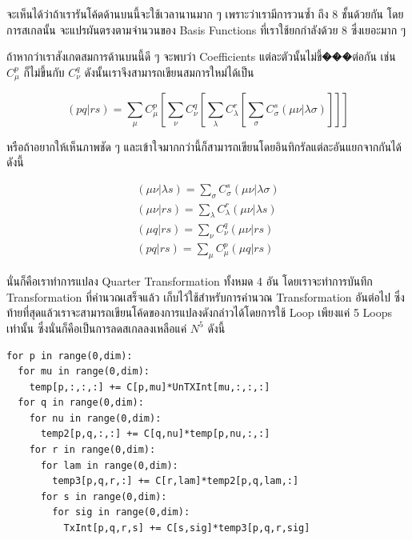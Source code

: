 \vspace{5pt}

\noindent จะเห็นได้ว่าถ้าเรารันโค้ดด้านบนนี้จะใช้เวลานานมาก ๆ เพราะว่าเรามีการวนซ้ำ  ถึง 8 ชั้นด้วยกัน โดยการสเกลนั้น%
จะแปรผันตรงตามจำนวนของ Basis Functions ที่เราใช้ยกกำลังด้วย 8 ซึ่งเยอะมาก ๆ

ถ้าหากว่าเราสังเกตสมการด้านบนนี้ดี ๆ จะพบว่า Coefficients แต่ละตัวนั้นไม่ขึ้���ต่อกัน เช่น $C^{p}_\mu$ ก็ไม่ขึ้นกับ $C^{q}_\nu$
ดังนั้นเราจึงสามารถเขียนสมการใหม่ได้เป็น

\begin{equation}
  (pq\vert rs)
  =
  \sum_\mu C^{p}_\mu
  [\sum_\nu C^{q}_\nu
    [\sum_\lambda C^{r}_\lambda
      [\sum_\sigma C^{s}_\sigma(\mu\nu\vert \lambda\sigma)]]]
\end{equation}

\noindent หรือถ้าอยากให้เห็นภาพชัด ๆ และเข้าใจมากกว่านี้ก็สามารถเขียนโดยอินทิกรัลแต่ละอันแยกจากกันได้ ดังนี้

\begin{gather}
  (\mu\nu\vert \lambda s) = \sum_\sigma C^{s}_\sigma(\mu\nu\vert \lambda\sigma) \\
  (\mu\nu\vert rs) = \sum_\lambda C^{r}_\lambda(\mu\nu\vert \lambda s) \\
  (\mu q\vert rs) = \sum_\nu C^{q}_\nu(\mu\nu\vert rs) \\
  (pq\vert rs) = \sum_\mu C^{p}_\mu(\mu q\vert rs)
\end{gather}

\noindent นั่นก็คือเราทำการแปลง Quarter Transformation ทั้งหมด 4 อัน โดยเราจะทำการบันทึก Transformation ที่คำนวณเสร็จแล้ว%
เก็บไว้ใช้สำหรับการคำนวณ Transformation อันต่อไป ซึ่งท้ายที่สุดแล้วเราจะสามารถเขียนโค้ดของการแปลงดังกล่าวได้โดยการใช้ Loop เพียงแค่
5 Loops เท่านั้น ซึ่งนั่นก็คือเป็นการลดสเกลลงเหลือแค่ $N^{5}$ ดังนี้

\vspace{5pt}

\begin{lstlisting}[style=MyPython]
for p in range(0,dim):  
  for mu in range(0,dim):  
    temp[p,:,:,:] += C[p,mu]*UnTXInt[mu,:,:,:]  
  for q in range(0,dim):  
    for nu in range(0,dim):  
      temp2[p,q,:,:] += C[q,nu]*temp[p,nu,:,:]  
    for r in range(0,dim):  
      for lam in range(0,dim):  
        temp3[p,q,r,:] += C[r,lam]*temp2[p,q,lam,:]  
      for s in range(0,dim):  
        for sig in range(0,dim):  
          TxInt[p,q,r,s] += C[s,sig]*temp3[p,q,r,sig]
\end{lstlisting}

